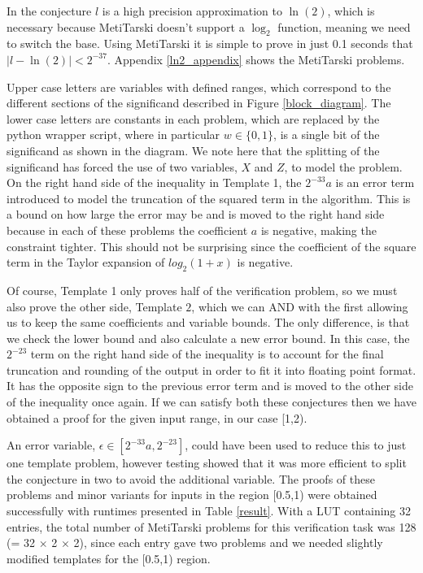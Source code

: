\documentclass{fac}
\newcommand{\abs}[1]{\lvert#1\rvert}
\begin{document}
In the conjecture $l$ is a high precision approximation to $\ln(2)$, which is necessary because MetiTarski doesn't support a $\log_2$ function, meaning we need to switch the base. Using MetiTarski it is simple to prove in just 0.1 seconds that $\abs{l-\ln{(2)}}<2^{-37}$. Appendix \ref{ln2_appendix} shows the MetiTarski problems.
 
Upper case letters are variables with defined ranges, which correspond to the different sections of the significand described in Figure \ref{block_diagram}. The lower case letters are constants in each problem, which are replaced by the python wrapper script, where in particular $w\in \{0,1\}$, is a single bit of the significand as shown in the diagram. We note here that the splitting of the significand has forced the use of two variables, $X$ and $Z$, to model the problem. On the right hand side of the inequality in Template 1, the $2^{-33}a$ is an error term introduced to model the truncation of the squared term in the algorithm. This is a bound on how large the error may be and is moved to the right hand side because in each of these problems the coefficient $a$ is negative, making the constraint tighter. This should not be surprising since the coefficient of the square term in the Taylor expansion of $log_2(1+x)$ is negative. 

Of course, Template 1 only proves half of the verification problem, so we must also prove the other side, Template $2$, which we can AND with the first allowing us to keep the same coefficients and variable bounds. The only difference, is that we check the lower bound and also calculate a new error bound. In this case, the $2^{-23}$ term on the right hand side of the inequality is to account for the final truncation and rounding of the output in order to fit it into floating point format. It has the opposite sign to the previous error term and is moved to the other side of the inequality once again. If we can satisfy both these conjectures then we have obtained a proof for the given input range, in our case [1,2). 

An error variable, $\epsilon \in [2^{-33}a, 2^{-23}]$, could have been used to reduce this to just one template problem, however testing showed that it was more efficient to split the conjecture in two to avoid the additional variable. The proofs of these problems and minor variants for inputs in the region [0.5,1) were obtained successfully with runtimes presented in Table \ref{result}. With a LUT containing 32 entries, the total number of MetiTarski problems for this verification task was 128 (= 32 $\times$ 2 $\times$ 2), since each entry gave two problems and we needed slightly modified templates for the [0.5,1) region. 
\end{document}

